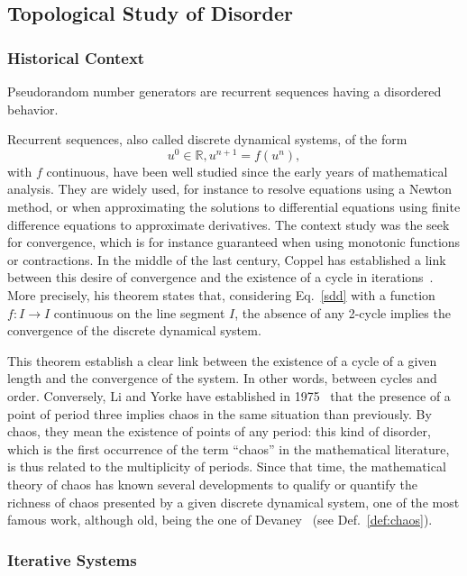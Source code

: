 \subsection{Topological Study of Disorder}

\subsubsection{Historical Context}


Pseudorandom number generators are recurrent sequences having a disordered behavior.

Recurrent sequences, also called discrete dynamical systems, of the form 
\begin{equation}
\label{sdd}
u^0 \in \mathds{R}, u^{n+1} = f(u^n),
\end{equation}
with 
$f$ continuous, have been well studied since the early years of mathematical
analysis. They are widely used, for instance to resolve equations using a
Newton method, or when approximating the solutions to differential equations 
using finite difference equations to approximate derivatives.
The context study was the seek for convergence, which is for instance guaranteed
when using monotonic functions or contractions. 
In the middle of the last century, Coppel has 
established a link between this desire of convergence
and the existence of a cycle in iterations~\cite{Coppel55}. 
More precisely, his theorem states that, considering Eq.~\eqref{sdd} with a function
$f:I \longrightarrow I$ continuous on the line segment $I$, the absence of
any 2-cycle implies the convergence of the discrete dynamical system.

This theorem establish a clear link between the existence of a cycle of 
a given length and the convergence of the system. In other words, between
cycles and order. Conversely, Li and Yorke have established in 1975~\cite{liyorke1975} that
the presence of a point of period three implies chaos in the same situation
than previously. By chaos, they mean the existence of points of any 
period: this kind of disorder, which is the first occurrence of the
term ``chaos'' in the mathematical literature, is thus related to the 
multiplicity of periods. Since that time, the mathematical theory of
chaos has known several developments to qualify or quantify the richness
of chaos presented by a given discrete dynamical system, one of the most
famous work, although old, being the one of Devaney~\cite{Dev89}
(see Def.~\ref{def:chaos}).

\subsubsection{Iterative Systems}

